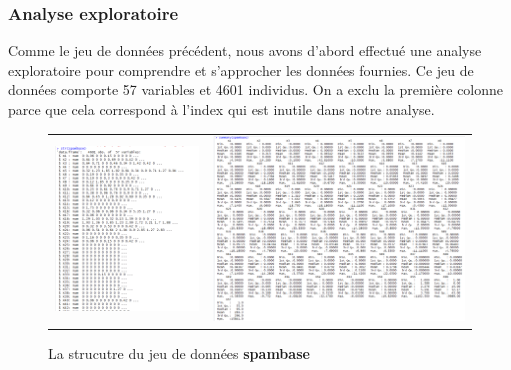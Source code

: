 \documentclass[a4paper,11pt,oneside,roman]{article}
\begin{document}
\subsubsection{Analyse exploratoire}
Comme le jeu de données précédent, nous avons d'abord effectué une analyse exploratoire pour comprendre et s'approcher les données fournies. \newline
Ce jeu de données comporte 57 variables et 4601 individus. On a exclu la première colonne parce que cela correspond à l'index qui est inutile dans notre analyse.
\begin{figure}[htb]
    \centering
    \begin{tabular}{cc}
    \includegraphics[scale = .5]{./discrimination/spambase/str.PNG} &
    \includegraphics[scale = .3]{./discrimination/spambase/summary.PNG}
    \end{tabular}
    \caption{La strucutre du jeu de données \textbf{spambase}}
    \label{fig:my_label}
\end{figure}
\end{document}
